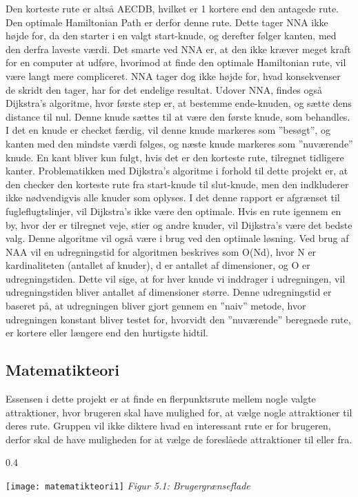 Den korteste rute er altså AECDB, hvilket er 1 kortere end den antagede rute. Den optimale Hamiltonian Path er derfor denne rute. Dette tager NNA ikke højde for, da den starter i en valgt start-knude, og derefter følger kanten, med den derfra laveste værdi. Det smarte ved NNA er, at den ikke kræver meget kraft for en computer at udføre, hvorimod at finde den optimale Hamiltonian rute, vil være langt mere compliceret. NNA tager dog ikke højde for, hvad konsekvenser de skridt den tager, har for det endelige resultat.
Udover NNA, findes også Dijkstra’s algoritme, hvor første step er, at bestemme ende-knuden, og sætte dens distance til nul. Denne knude sættes til at være den første knude, som behandles. I det en knude er checket færdig, vil denne knude markeres som ”besøgt”, og kanten med den mindste værdi følges, og næste knude markeres som ”nuværende” knude. En kant bliver kun fulgt, hvis det er den korteste rute, tilregnet tidligere kanter.
Problematikken med Dijkstra’s algoritme i forhold til dette projekt er, at den checker den korteste rute fra start-knude til slut-knude, men den indkluderer ikke nødvendigvis alle knuder som oplyses. I det denne rapport er afgrænset til fugleflugtslinjer, vil Dijkstra’s ikke være den optimale. Hvis en rute igennem en by, hvor der er tilregnet veje, stier og andre knuder, vil Dijkstra’s være det bedste valg. Denne algoritme vil også være i brug ved den optimale løsning.
Ved brug af NAA vil en udregningstid for algoritmen beskrives som O(Nd), hvor N er kardinaliteten (antallet af knuder),  d er antallet af dimensioner, og O er udregningstiden. Dette vil sige, at for hver knude vi inddrager i udregningen, vil udregningstiden bliver antallet af dimensioner større. Denne udregningstid er baseret på, at udregningen bliver gjort gennem en ”naiv” metode, hvor udregningen konstant bliver testet for, hvorvidt den ”nuværende” beregnede rute, er kortere eller længere end den hurtigste hidtil.

\subsection{Matematikteori}
Essensen i dette projekt er at finde en flerpunktsrute mellem nogle valgte attraktioner, hvor brugeren skal have mulighed for, at vælge nogle attraktioner til deres rute. Gruppen vil ikke diktere hvad en interessant rute er for brugeren, derfor skal de have muligheden for at vælge de foreslåede attraktioner til eller fra. \newpage

\begin{wrapfigure}{}{0.4\textwidth}
  \vspace{-10pt}
  \begin{center}
    \texttt{[image: matematikteori1]} \newline
    \textit{Figur 5.1: Brugergrænseflade}\newline
  \end{center}
  \vspace{-20pt}
\end{wrapfigure}
 

